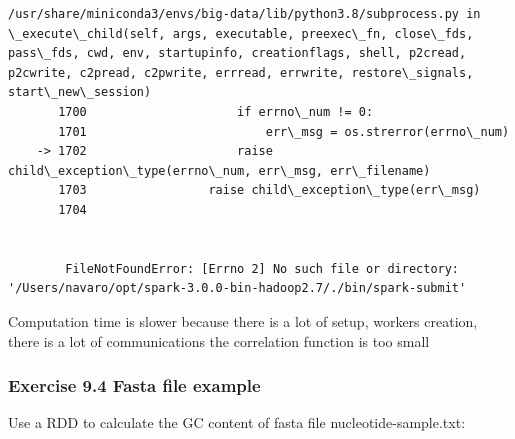 \documentclass[11pt]{article}
\begin{document}
\begin{Verbatim}[commandchars=\\\{\}]
        /usr/share/miniconda3/envs/big-data/lib/python3.8/subprocess.py in \_execute\_child(self, args, executable, preexec\_fn, close\_fds, pass\_fds, cwd, env, startupinfo, creationflags, shell, p2cread, p2cwrite, c2pread, c2pwrite, errread, errwrite, restore\_signals, start\_new\_session)
       1700                     if errno\_num != 0:
       1701                         err\_msg = os.strerror(errno\_num)
    -> 1702                     raise child\_exception\_type(errno\_num, err\_msg, err\_filename)
       1703                 raise child\_exception\_type(err\_msg)
       1704 


        FileNotFoundError: [Errno 2] No such file or directory: '/Users/navaro/opt/spark-3.0.0-bin-hadoop2.7/./bin/spark-submit'

    \end{Verbatim}

    Computation time is slower because there is a lot of setup, workers
creation, there is a lot of communications the correlation function is
too small

\subsubsection{Exercise 9.4 Fasta file
example}\label{exercise-9.4-fasta-file-example}

Use a RDD to calculate the GC content of fasta file
nucleotide-sample.txt:
\end{document}
